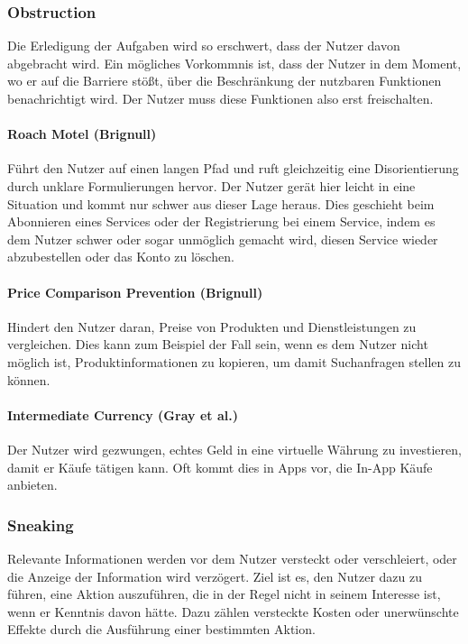 \documentclass[a4paper]{article}
\begin{document}
\subsubsection{Obstruction} 
\label{sssec:obstruction}
Die Erledigung der Aufgaben wird so erschwert, dass der Nutzer davon abgebracht wird. Ein mögliches Vorkommnis ist, dass der Nutzer in dem Moment, wo er auf die Barriere stößt, über die Beschränkung der nutzbaren Funktionen benachrichtigt wird. Der Nutzer muss diese Funktionen also erst freischalten.	

\paragraph{Roach Motel (Brignull)} 
\label{para:roach_motel}
Führt den Nutzer auf einen langen Pfad und ruft gleichzeitig eine Disorientierung durch unklare Formulierungen hervor. Der Nutzer gerät hier leicht in eine Situation und kommt nur schwer aus dieser Lage heraus. Dies geschieht beim Abonnieren eines Services oder der Registrierung bei einem Service, indem es dem Nutzer schwer oder sogar unmöglich gemacht wird, diesen Service wieder abzubestellen oder das Konto zu löschen.

\paragraph{Price Comparison Prevention (Brignull)} 
\label{para:price_comparison_prevention}
Hindert den Nutzer daran, Preise von Produkten und Dienstleistungen zu vergleichen. Dies kann zum Beispiel der Fall sein, wenn es dem Nutzer nicht möglich ist, Produktinformationen zu kopieren, um damit Suchanfragen stellen zu können.

\paragraph{Intermediate Currency (Gray et al.)} 
\label{para:intermediate_currency}
Der Nutzer wird gezwungen, echtes Geld in eine virtuelle Währung zu investieren, damit er Käufe tätigen kann. Oft kommt dies in Apps vor, die In-App Käufe anbieten.

\subsubsection{Sneaking}
\label{sssec:sneaking}
Relevante Informationen werden vor dem Nutzer versteckt oder verschleiert, oder die Anzeige der Information wird verzögert. Ziel ist es, den Nutzer dazu zu führen, eine Aktion auszuführen, die in der Regel nicht in seinem Interesse ist, wenn er Kenntnis davon hätte. Dazu zählen versteckte Kosten oder unerwünschte Effekte durch die Ausführung einer bestimmten Aktion.
\end{document}
